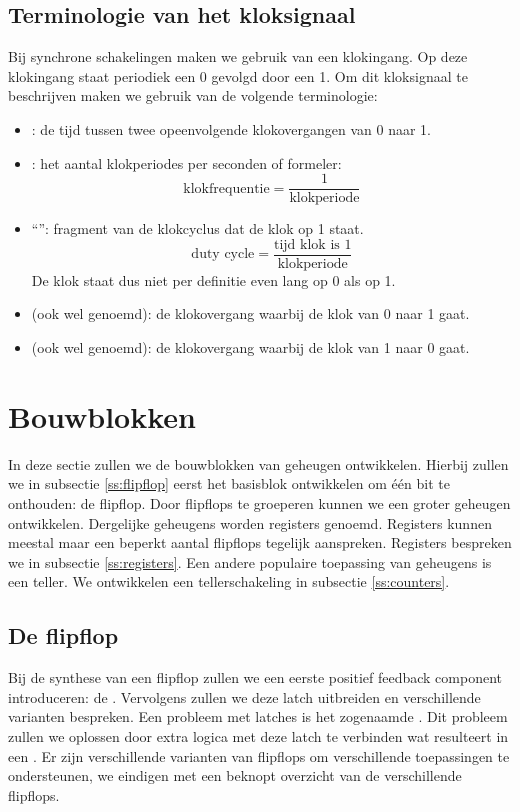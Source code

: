 \subsection{Terminologie van het kloksignaal}
Bij synchrone schakelingen maken we gebruik van een klokingang. Op deze klokingang staat periodiek een 0 gevolgd door een 1. Om dit kloksignaal te beschrijven maken we gebruik van de volgende terminologie:
\begin{itemize}
 \item {}: de tijd tussen twee opeenvolgende klokovergangen van 0 naar 1.
 \item {}: het aantal klokperiodes per seconden of formeler:
\begin{equation}
\mbox{klokfrequentie}=\displaystyle\frac{1}{\mbox{klokperiode}}
\end{equation}
 \item ``'': fragment van de klokcyclus dat de klok op 1 staat.
\begin{equation}
\mbox{duty cycle}=\displaystyle\frac{\mbox{tijd klok is 1}}{\mbox{klokperiode}}
\end{equation}
De klok staat dus niet per definitie even lang op 0 als op 1.
 \item {} (ook wel  genoemd): de klokovergang waarbij de klok van 0 naar 1 gaat.
 \item {} (ook wel  genoemd): de klokovergang waarbij de klok van 1 naar 0 gaat.
\end{itemize}
\section{Bouwblokken}
\label{s:memory}
\label{s:memoryBlocks}
In deze sectie zullen we de bouwblokken van geheugen ontwikkelen. Hierbij zullen we in subsectie \ref{ss:flipflop} eerst het basisblok ontwikkelen om \'e\'en bit te onthouden: de flipflop. Door flipflops te groeperen kunnen we een groter geheugen ontwikkelen. Dergelijke geheugens worden registers genoemd. Registers kunnen meestal maar een beperkt aantal flipflops tegelijk aanspreken. Registers bespreken we in subsectie \ref{ss:registers}. Een andere populaire toepassing van geheugens is een teller. We ontwikkelen een tellerschakeling in subsectie \ref{ss:counters}.
\subsection{De flipflop}
Bij de synthese van een flipflop zullen we een eerste positief feedback component introduceren: de . Vervolgens zullen we deze latch uitbreiden en verschillende varianten bespreken. Een probleem met latches is het zogenaamde . Dit probleem zullen we oplossen door extra logica met deze latch te verbinden wat resulteert in een . Er zijn verschillende varianten van flipflops om verschillende toepassingen te ondersteunen, we eindigen met een beknopt overzicht van de verschillende flipflops.
